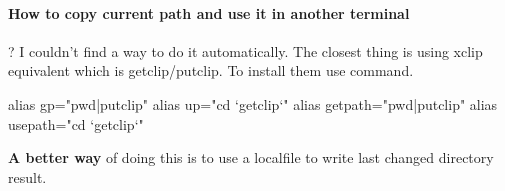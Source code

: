\paragraph{How to copy current path and use it in another terminal}?\newline
I couldn't find a way to do it automatically. The closest thing is using xclip equivalent which is getclip/putclip. To install them use  command.

\begin{jscode}
alias gp="pwd|putclip"
alias up="cd `getclip`"
alias getpath="pwd|putclip"
alias usepath="cd `getclip`"
\end{jscode}

\textbf{A better way} of doing this is to use a localfile to write last changed directory result.\newline
{}



